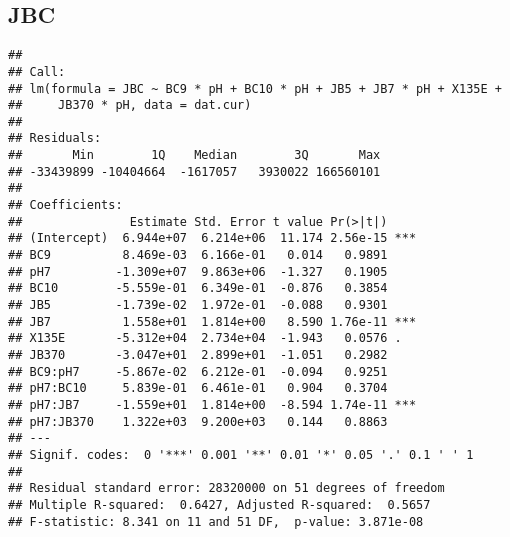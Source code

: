 \documentclass[
]{article}
\newenvironment{Shaded}{\begin{snugshade}}{\end{snugshade}}
\newcommand{\AttributeTok}[1]{\textcolor[rgb]{0.13,0.29,0.53}{#1}}
\newcommand{\CommentTok}[1]{\textcolor[rgb]{0.56,0.35,0.01}{\textit{#1}}}
\newcommand{\DecValTok}[1]{\textcolor[rgb]{0.00,0.00,0.81}{#1}}
\newcommand{\FunctionTok}[1]{\textcolor[rgb]{0.13,0.29,0.53}{\textbf{#1}}}
\newcommand{\NormalTok}[1]{#1}
\newcommand{\OtherTok}[1]{\textcolor[rgb]{0.56,0.35,0.01}{#1}}
\newcommand{\SpecialCharTok}[1]{\textcolor[rgb]{0.81,0.36,0.00}{\textbf{#1}}}
\begin{document}
\hypertarget{jbc}{%
\subsection{JBC}\label{jbc}}

\begin{Shaded}
\end{Shaded}

\begin{verbatim}
## 
## Call:
## lm(formula = JBC ~ BC9 * pH + BC10 * pH + JB5 + JB7 * pH + X135E + 
##     JB370 * pH, data = dat.cur)
## 
## Residuals:
##       Min        1Q    Median        3Q       Max 
## -33439899 -10404664  -1617057   3930022 166560101 
## 
## Coefficients:
##               Estimate Std. Error t value Pr(>|t|)    
## (Intercept)  6.944e+07  6.214e+06  11.174 2.56e-15 ***
## BC9          8.469e-03  6.166e-01   0.014   0.9891    
## pH7         -1.309e+07  9.863e+06  -1.327   0.1905    
## BC10        -5.559e-01  6.349e-01  -0.876   0.3854    
## JB5         -1.739e-02  1.972e-01  -0.088   0.9301    
## JB7          1.558e+01  1.814e+00   8.590 1.76e-11 ***
## X135E       -5.312e+04  2.734e+04  -1.943   0.0576 .  
## JB370       -3.047e+01  2.899e+01  -1.051   0.2982    
## BC9:pH7     -5.867e-02  6.212e-01  -0.094   0.9251    
## pH7:BC10     5.839e-01  6.461e-01   0.904   0.3704    
## pH7:JB7     -1.559e+01  1.814e+00  -8.594 1.74e-11 ***
## pH7:JB370    1.322e+03  9.200e+03   0.144   0.8863    
## ---
## Signif. codes:  0 '***' 0.001 '**' 0.01 '*' 0.05 '.' 0.1 ' ' 1
## 
## Residual standard error: 28320000 on 51 degrees of freedom
## Multiple R-squared:  0.6427, Adjusted R-squared:  0.5657 
## F-statistic: 8.341 on 11 and 51 DF,  p-value: 3.871e-08
\end{verbatim}
\end{document}
